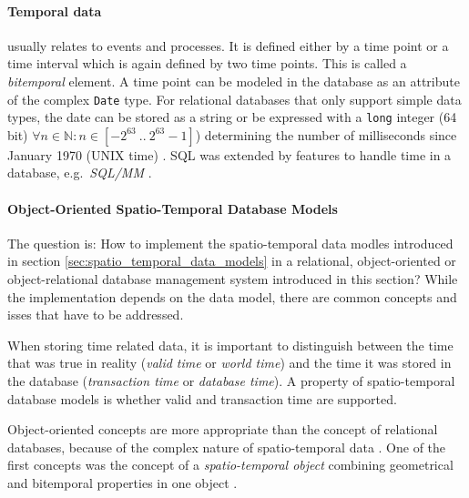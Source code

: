 

\paragraph{Temporal data} %
\label{par:temporal_data}

usually relates to events and processes. It is defined either by a time point or a time interval which is again defined by two time points. This is called a \emph{bitemporal} element. A time point can be modeled in the database as an attribute of the complex \texttt{Date} type. For relational databases that only support simple data types, the date can be stored as a string or be expressed with a \texttt{long} integer (64 bit) $\forall n \in \mathbb{N}: n \in [-2^{63}~..~2^{63}-1]$) determining the number of milliseconds since  January 1970 (UNIX time) \cite{timeInRDBMS}. SQL was extended by features to handle time in a database, e.g.\ \emph{SQL/MM} \cite[chapter 6]{peuquet99}.


\paragraph{Object-Oriented Spatio-Temporal Database Models} %
\label{par:object_oriented_spatio_temporal_database_models}

The question is: How to implement the spatio-temporal data modles introduced in section \ref{sec:spatio_temporal_data_models} in a relational, object-oriented or object-relational database management system introduced in this section? While the implementation depends on the data model, there are common concepts and isses that have to be addressed.

When storing time related data, it is important to distinguish between the time that was true in reality (\emph{valid time} or \emph{world time}) and the time it was stored in the database (\emph{transaction time} or \emph{database time}). A property of spatio-temporal database models is whether valid and transaction time are supported.

Object-oriented concepts are more appropriate than the concept of relational databases, because of the complex nature of spatio-temporal data \cite[section 3.9]{pelekis04stdms}. One of the first concepts was the concept of a \emph{spatio-temporal object} combining geometrical and bitemporal properties in one object \cite{worboys90stdm}.

